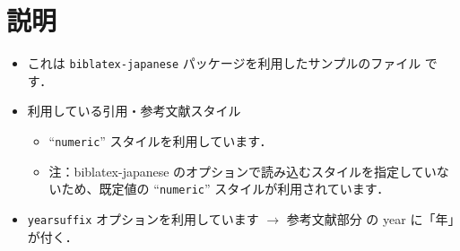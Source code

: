 \documentclass[10pt]{jlreq}
\begin{document}
\section{説明}

\begin{itemize}
 \item これは \texttt{biblatex-japanese} パッケージを利用したサンプルのファイル
       です．
 \item 利用している引用・参考文献スタイル
       \begin{itemize}
        \item ``\texttt{numeric}'' スタイルを利用しています．
        \item 注：biblatex-japanese のオプションで読み込むスタイルを指定していな
              いため、既定値の ``\texttt{numeric}'' スタイルが利用されています．
       \end{itemize}
 \item \texttt{yearsuffix} オプションを利用しています $\rightarrow$ 参考文献部分
       の year に「年」が付く．
\end{itemize}


\end{document}
